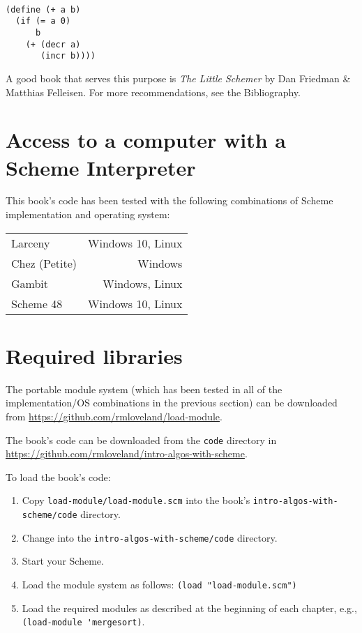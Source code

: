 \documentclass[12pt,openright,draft]{book}
\begin{document}
\begin{verbatim}

(define (+ a b)
  (if (= a 0)
      b
    (+ (decr a)
       (incr b))))

\end{verbatim}

A good book that serves this purpose is \emph{The Little Schemer} by Dan
Friedman \& Matthias Felleisen.  For more recommendations, see the
Bibliography.

\section{Access to a computer with a Scheme Interpreter}

This book's code has been tested with the following combinations of
Scheme implementation and operating system:

\begin{tabular}{ l r }
Larceny        & Windows 10, Linux \\
Chez (Petite)  & Windows           \\
Gambit         & Windows, Linux    \\
Scheme 48      & Windows 10, Linux \\
\end{tabular}

\section{Required libraries}

The portable module system (which has been tested in all of the
implementation/OS combinations in the previous section) can be
downloaded from \url{https://github.com/rmloveland/load-module}.

The book's code can be downloaded from the \verb|code| directory in
\url{https://github.com/rmloveland/intro-algos-with-scheme}.

To load the book's code:

\begin{enumerate}
\item Copy \verb|load-module/load-module.scm| into the book's \verb|intro-algos-with-scheme/code| directory.

\item Change into the \verb|intro-algos-with-scheme/code| directory.

\item Start your Scheme.

\item Load the module system as follows: \verb|(load "load-module.scm")|

\item Load the required modules as described at the beginning of each chapter, e.g., \verb|(load-module 'mergesort)|.
\end{enumerate}
\end{document}
